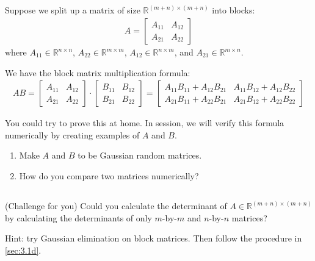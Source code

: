 \documentclass[11pt,letterpaper]{report}
\begin{document}
\subsection{}
Suppose we split up a matrix of size $\mathbb{R}^{(m+n)\times(m+n)}$ into blocks:
\begin{align*}
    A = \left[\begin{array}{c|c} A_{11} & A_{12} \\\hline A_{21} & A_{22} \end{array}\right]
\end{align*}
where $A_{11}\in\mathbb{R}^{n\times n}$, $A_{22}\in\mathbb{R}^{m\times m}$, $A_{12}\in\mathbb{R}^{n\times m}$, and $A_{21}\in\mathbb{R}^{m\times n}$. 

We have the block matrix multiplication formula:
\begin{align*}
    AB = \left[
\begin{array}{c|c} A_{11} & A_{12} \\\hline A_{21} & A_{22} \end{array} \right]\cdot
\left[
\begin{array}{c|c} B_{11} & B_{12} \\\hline B_{21} & B_{22} \end{array} \right]
= 
\left[
\begin{array}{c|c} A_{11}B_{11}+A_{12}B_{21} & A_{11}B_{12}+A_{12}B_{22} \\\hline A_{21}B_{11}+A_{22}B_{21} & A_{21}B_{12}+A_{22}B_{22} \end{array} \right]
\end{align*}

You could try to prove this at home. In session, we will verify this formula numerically by creating examples of $A$ and $B$.

\begin{enumerate}
    \item Make $A$ and $B$ to be Gaussian random matrices.
    \item How do you compare two matrices numerically?
\end{enumerate}

\subsection{}
(Challenge for you) Could you calculate the determinant of $A\in \mathbb{R}^{(m+n)\times(m+n)}$ by calculating the determinants of only $m$-by-$m$ and $n$-by-$n$ matrices? 

Hint: try Gaussian elimination on block matrices. Then follow the procedure in \ref{sec:3.1d}.
\end{document}

